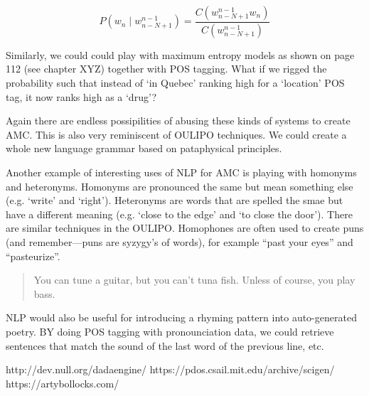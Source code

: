 \begin{equation}
  P(w_n \mid w_{n-N+1}^{n-1}) = \frac{C(w_{n-N+1}^{n-1} w_n)}{C(w_{n-N+1}^{n-1})}
  \label{eq:probmoe}
\end{equation}

Similarly, we could could play with maximum entropy models as shown on page \num{112} (see chapter XYZ) together with \ac{POS} tagging. What if we rigged the probability such that instead of `in Quebec' ranking high for a `location' \ac{POS} tag, it now ranks high as a `drug'?

Again there are endless possipilities of abusing these kinds of systems to create \ac{AMC}. This is also very reminiscent of \ac{OULIPO} techniques. We could create a whole new language grammar based on pataphysical principles.

Another example of interesting uses of \ac{NLP} for \ac{AMC} is playing with homonyms and heteronyms. Homonyms are pronounced the same but mean something else (e.g. `write' and `right'). Heteronyms are words that are spelled the smae but have a different meaning (e.g. `close to the edge' and `to close the door'). There are similar techniques in the \ac{OULIPO}. Homophones are often used to create puns (and remember---puns are syzygy's of words), for example ``past your eyes'' and ``pasteurize''. 

\begin{quotation}
   You can tune a guitar, but you can't tuna fish. Unless of course, you play bass. 
\end{quotation}

\ac{NLP} would also be useful for introducing a rhyming pattern into auto-generated poetry. BY doing \ac{POS} tagging with pronounciation data, we could retrieve sentences that match the sound of the last word of the previous line, etc.


http://dev.null.org/dadaengine/
https://pdos.csail.mit.edu/archive/scigen/
https://artybollocks.com/





